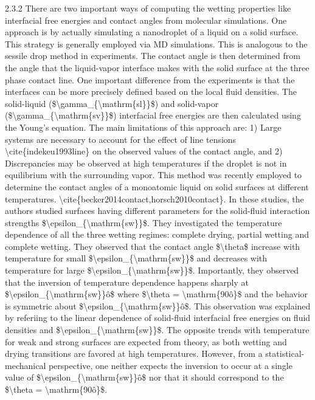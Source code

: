 \par 2.3.2 There are two important ways of computing the wetting properties like interfacial free energies and contact angles from molecular simulations. One approach is by actually simulating a nanodroplet of a liquid on a solid surface. This strategy is generally employed via MD simulations. This is analogous to the sessile drop method in experiments.  The contact angle is then determined from the angle that the liquid-vapor interface makes with the solid surface at the three phase contact line. One important difference from the experiments is that the interfaces can be more precisely defined based on the local fluid densities. The solid-liquid (\$\textbackslash gamma\_\{\textbackslash mathrm\{sl\}\}\$)  and solid-vapor (\$\textbackslash gamma\_\{\textbackslash mathrm\{sv\}\}\$) interfacial free energies are then calculated using the Young's equation. The main limitations of this approach are: 1) Large systems are necessary to account for the effect of line tensions \textbackslash cite\{indekeu1993line\} on the observed values of the contact angle, and 2) Discrepancies may be observed at high temperatures if the droplet is not in equilibrium with the surrounding vapor. This method was recently employed to determine the contact angles of a monoatomic liquid on solid surfaces at different temperatures. \textbackslash cite\{becker2014contact,horsch2010contact\}. In these studies, the authors studied surfaces having different parameters for the solid-fluid interaction strengths \$\textbackslash epsilon\_\{\textbackslash mathrm\{sw\}\}\$. They investigated the temperature dependence of all the three wetting regimes: complete drying, partial wetting and complete wetting. They observed that the contact angle \$\textbackslash theta\$  increase with temperature for small \$\textbackslash epsilon\_\{\textbackslash mathrm\{sw\}\}\$ and decreases with temperature for large \$\textbackslash epsilon\_\{\textbackslash mathrm\{sw\}\}\$. Importantly, they observed that the inversion of temperature dependence happens sharply at \$\textbackslash epsilon\_\{\textbackslash mathrm\{sw\}\}\^o\$ where \$\textbackslash theta = \textbackslash mathrm\{90\^o\}\$ and the behavior is symmetric about \$\textbackslash epsilon\_\{\textbackslash mathrm\{sw\}\}\^o\$. This observation was explained by referiing to the linear dependence of solid-fluid interfacial free energies on fluid densities and \$\textbackslash epsilon\_\{\textbackslash mathrm\{sw\}\}\$. The opposite trends with temperature for weak and strong surfaces are expected from theory, as both wetting and drying transitions are favored at high temperatures. However, from a statistical-mechanical perspective, one neither expects the inversion to occur at a single value of \$\textbackslash epsilon\_\{\textbackslash mathrm\{sw\}\}\^o\$ nor that it should correspond to the \$\textbackslash theta = \textbackslash mathrm\{90\^o\}\$.
